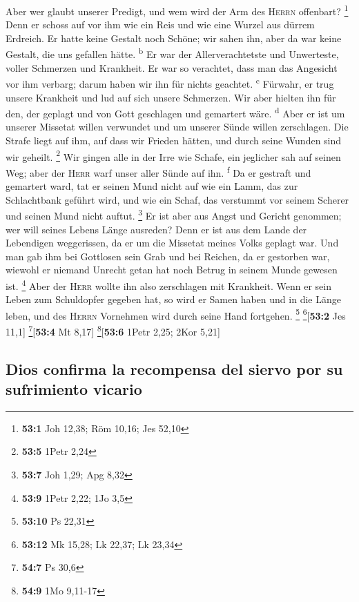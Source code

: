  Aber wer glaubt unserer Predigt, und wem wird der Arm des
\textsc{Herrn} offenbart? \footnote{\textbf{53:1} Joh 12,38; Röm 10,16;
  Jes 52,10}  Denn er schoss auf vor ihm wie ein Reis und
wie eine Wurzel aus dürrem Erdreich. Er hatte keine Gestalt noch Schöne;
wir sahen ihn, aber da war keine Gestalt, die uns gefallen hätte.
\textsuperscript{b}  Er war der Allerverachtetste und
Unwerteste, voller Schmerzen und Krankheit. Er war so verachtet, dass
man das Angesicht vor ihm verbarg; darum haben wir ihn für nichts
geachtet. \textsuperscript{c}  Fürwahr, er trug unsere
Krankheit und lud auf sich unsere Schmerzen. Wir aber hielten ihn für
den, der geplagt und von Gott geschlagen und gemartert wäre.
\textsuperscript{d}  Aber er ist um unserer Missetat
willen verwundet und um unserer Sünde willen zerschlagen. Die Strafe
liegt auf ihm, auf dass wir Frieden hätten, und durch seine Wunden sind
wir geheilt. \footnote{\textbf{53:5} 1Petr 2,24}  Wir
gingen alle in der Irre wie Schafe, ein jeglicher sah auf seinen Weg;
aber der \textsc{Herr} warf unser aller Sünde auf ihn.
\textsuperscript{f}  Da er gestraft und gemartert ward,
tat er seinen Mund nicht auf wie ein Lamm, das zur Schlachtbank geführt
wird, und wie ein Schaf, das verstummt vor seinem Scherer und seinen
Mund nicht auftut. \footnote{\textbf{53:7} Joh 1,29; Apg 8,32}
 Er ist aber aus Angst und Gericht genommen; wer will
seines Lebens Länge ausreden? Denn er ist aus dem Lande der Lebendigen
weggerissen, da er um die Missetat meines Volks geplagt war.
 Und man gab ihm bei Gottlosen sein Grab und bei Reichen,
da er gestorben war, wiewohl er niemand Unrecht getan hat noch Betrug in
seinem Munde gewesen ist. \footnote{\textbf{53:9} 1Petr 2,22; 1Jo 3,5}
 Aber der \textsc{Herr} wollte ihn also zerschlagen mit
Krankheit. Wenn er sein Leben zum Schuldopfer gegeben hat, so wird er
Samen haben und in die Länge leben, und des \textsc{Herrn} Vornehmen
wird durch seine Hand fortgehen. \footnote{\textbf{53:10} Ps 22,31}
\footnote{\textbf{53:12} Mk 15,28; Lk 22,37; Lk 23,34}{[}\textbf{53:2}
Jes 11,1{]} \footnote{\textbf{54:7} Ps 30,6}{[}\textbf{53:4} Mt 8,17{]}
\footnote{\textbf{54:9} 1Mo 9,11-17}{[}\textbf{53:6} 1Petr 2,25; 2Kor
5,21{]}

\hypertarget{dios-confirma-la-recompensa-del-siervo-por-su-sufrimiento-vicario}{%
\subsection{Dios confirma la recompensa del siervo por su sufrimiento
vicario}\label{dios-confirma-la-recompensa-del-siervo-por-su-sufrimiento-vicario}}

